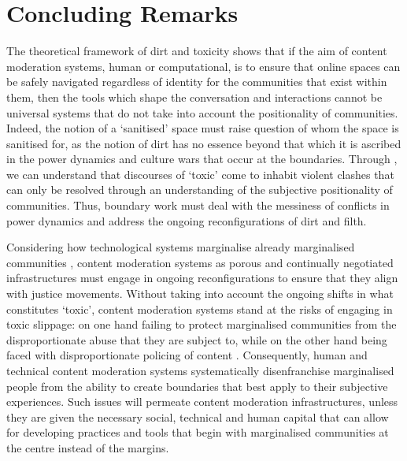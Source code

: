 \section{Concluding Remarks}\label{sec:filter_conclusion}

The theoretical framework of dirt and toxicity shows that if the aim of content moderation systems, human or computational, is to ensure that online spaces can be safely navigated regardless of identity for the communities that exist within them, then the tools which shape the conversation and interactions cannot be universal systems that do not take into account the positionality of communities.
Indeed, the notion of a `sanitised' space must raise question of whom the space is sanitised for, as the notion of dirt has no essence beyond that which it is ascribed in the power dynamics and culture wars that occur at the boundaries.
Through \citet{Risam:2015}, we can understand that discourses of `toxic' come to inhabit violent clashes that can only be resolved through an understanding of the subjective positionality of communities.
Thus, boundary work must deal with the messiness of conflicts in power dynamics and address the ongoing reconfigurations of dirt and filth.

Considering how technological systems marginalise already marginalised communities \citep{Benjamin:2019}, content moderation systems as porous and continually negotiated infrastructures must engage in ongoing reconfigurations to ensure that they align with justice movements.
Without taking into account the ongoing shifts in what constitutes `toxic', content moderation systems stand at the risks of engaging in toxic slippage: on one hand failing to protect marginalised communities from the disproportionate abuse that they are subject to, while on the other hand being faced with disproportionate policing of content \citep{Schaffer:2015}.
Consequently, human and technical content moderation systems systematically disenfranchise marginalised people from the ability to create boundaries that best apply to their subjective experiences.
Such issues will permeate content moderation infrastructures, unless they are given the necessary social, technical and human capital that can allow for developing practices and tools that begin with marginalised communities at the centre instead of the margins.


